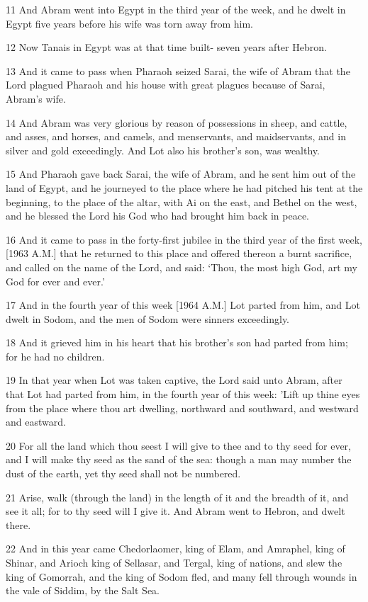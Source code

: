 \par 11 And Abram went into Egypt in the third year of the week, and he dwelt in Egypt five years before his wife was torn away from him.
\par 12 Now Tanais in Egypt was at that time built- seven years after Hebron.
\par 13 And it came to pass when Pharaoh seized Sarai, the wife of Abram that the Lord plagued Pharaoh and his house with great plagues because of Sarai, Abram's wife.
\par 14 And Abram was very glorious by reason of possessions in sheep, and cattle, and asses, and horses, and camels, and menservants, and maidservants, and in silver and gold exceedingly. And Lot also his brother's son, was wealthy.
\par 15 And Pharaoh gave back Sarai, the wife of Abram, and he sent him out of the land of Egypt, and he journeyed to the place where he had pitched his tent at the beginning, to the place of the altar, with Ai on the east, and Bethel on the west, and he blessed the Lord his God who had brought him back in peace.
\par 16 And it came to pass in the forty-first jubilee in the third year of the first week, [1963 A.M.] that he returned to this place and offered thereon a burnt sacrifice, and called on the name of the Lord, and said: ‘Thou, the most high God, art my God for ever and ever.’
\par 17 And in the fourth year of this week [1964 A.M.] Lot parted from him, and Lot dwelt in Sodom, and the men of Sodom were sinners exceedingly.
\par 18 And it grieved him in his heart that his brother's son had parted from him; for he had no children.
\par 19 In that year when Lot was taken captive, the Lord said unto Abram, after that Lot had parted from him, in the fourth year of this week: 'Lift up thine eyes from the place where thou art dwelling, northward and southward, and westward and eastward.
\par 20 For all the land which thou seest I will give to thee and to thy seed for ever, and I will make thy seed as the sand of the sea: though a man may number the dust of the earth, yet thy seed shall not be numbered.
\par 21 Arise, walk (through the land) in the length of it and the breadth of it, and see it all; for to thy seed will I give it. And Abram went to Hebron, and dwelt there.
\par 22 And in this year came Chedorlaomer, king of Elam, and Amraphel, king of Shinar, and Arioch king of Sellasar, and Tergal, king of nations, and slew the king of Gomorrah, and the king of Sodom fled, and many fell through wounds in the vale of Siddim, by the Salt Sea.
